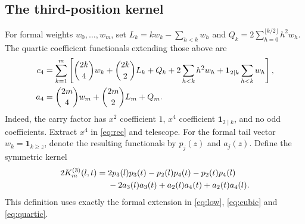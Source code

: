 \documentclass[11pt]{article}
\newcommand{\ind}{\mathbf1}
\begin{document}
\subsection{The third-position kernel}
For formal weights $w_0,\ldots,w_m$, set
$L_k=kw_k-\sum_{h<k}w_h$ and
$Q_k=2\sum_{h=0}^{\lfloor k/2\rfloor}h^2w_h$.
The quartic coefficient functionals extending those above are
\begin{align}
 c_4&=\sum_{k=1}^m\left[
 \binom{2k}{4}w_k+\binom{2k}{2}L_k+Q_k
 +2\sum_{h<k}h^2w_h+\ind_{2\mid k}\sum_{h<k}w_h\right],\label{eq:quartic}\\
 a_4&=\binom{2m}{4}w_m+\binom{2m}{2}L_m+Q_m.\notag
\end{align}
Indeed, the carry factor has $x^2$ coefficient $1$, $x^4$ coefficient
$\ind_{2\mid k}$, and no odd coefficients. Extract $x^4$ in
\eqref{eq:rec} and telescope.
For the formal tail vector $w_k=\ind_{k\ge z}$, denote the resulting
functionals by $p_j(z)$ and $a_j(z)$. Define the symmetric kernel
\begin{align}\label{eq:k3}
 2K^{(3)}_m(l,t)={}&2p_3(l)p_3(t)-p_2(l)p_4(t)-p_2(t)p_4(l)\notag\\
 &-2a_3(l)a_3(t)+a_2(l)a_4(t)+a_2(t)a_4(l).
\end{align}
This definition uses exactly the formal extension in
\eqref{eq:low}, \eqref{eq:cubic} and \eqref{eq:quartic}.
\end{document}
